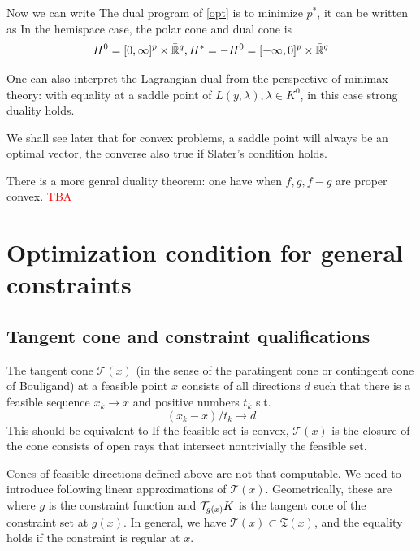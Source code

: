\documentclass[a4paper]{mynotes}
\def\redd#1{\textcolor{red}{#1}}
\begin{document}
Now we can write 
The dual program of \ref{opt} is to minimize $p^*$, it can be written as   In the hemispace case, the polar cone and dual cone is $$H^0=[0,\infty]^p\times \bar{\mathbb{R}}^q,H^*=-H^0=[-\infty,0]^p\times \bar{\mathbb{R}}^q$$
 
One can also interpret the Lagrangian dual from the perspective of minimax theory: 
with equality at a saddle point of $L(y,\lambda), \lambda\in K^0$, in this case strong duality holds. 

We shall see later that for convex problems, a saddle point will always be an optimal vector, the converse also true if Slater's condition holds.

There is a more genral duality theorem\cite{roc}: one have when $f,g,f-g$ are proper convex. \redd{TBA}

\section{Optimization condition for general constraints}
\subsection{Tangent cone and constraint qualifications}
\def\F{\mathfrak{T}}
 The tangent cone $\mathcal{T}(x)$ (in the sense of the paratingent cone or contingent cone of Bouligand) at a feasible point $x$ consists of all directions $d$ such that there is a feasible sequence $x_k\to x$ and positive numbers $t_k$ s.t. $$(x_k-x)/t_k\to d$$
 This should be equivalent to    If the feasible set is convex, $\mathcal{T}(x)$ is the closure of the cone consists of open rays that intersect nontrivially the feasible set.

 Cones of feasible directions defined above are not that computable. We need to introduce following linear approximations of $\mathcal{T}(x)$. Geometrically, these are \gs{\F(x)=(dF)^{-1}(\T_{g(x)}K)} where $g$ is the constraint function and $\mathcal T_{g(x)}K$ is the tangent cone of the constraint set at $g(x)$. In general, we have $\mathcal{T}(x)\subset \F(x)$, and the equality holds if the constraint is regular at $x$.
\end{document}
